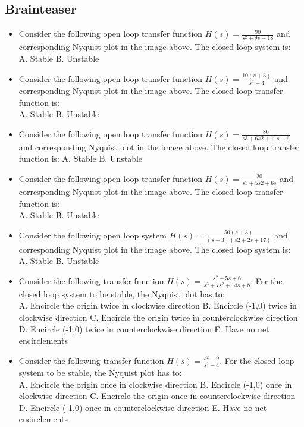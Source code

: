 \documentclass{document}
\begin{document}
	\subsection{Brainteaser}
	\begin{itemize}
		\item Consider the following open loop transfer function $H(s)=\frac{90}{s^2+9s+18}$ and corresponding Nyquist plot in the image above.
		The closed loop system is:\\
		A. Stable
		B. Unstable
		\item Consider the following open loop transfer function $H(s)=\frac{10(s+3)}{s^2−4}$ and corresponding Nyquist plot in the image above.
		The closed loop transfer function is:\\
		A. Stable
		B. Unstable
		\item Consider the following open loop transfer function $H(s)=\frac{80}{s3+6s2+11s+6}$ and corresponding Nyquist plot in the image above.
		The closed loop transfer function is:
		A. Stable
		B. Unstable
		\item Consider the following open loop transfer function $H(s)=\frac{20}{s3+5s2+6s}$ and corresponding Nyquist plot in the image above.
		The closed loop transfer function is:\\
		A. Stable
		B. Unstable
		\item Consider the following open loop system $H(s)= \frac{50(s+3)}{(s−3)(s2+2s+17)}$ and corresponding Nyquist plot in the image above.
		The closed loop system is:\\
		A. Stable
		B. Unstable
		\item Consider the following transfer function $H(s)=\frac{s^2−5s+6}{s^3+7s^2+14s+8}$. For the closed loop system to be stable, the Nyquist plot has to:\\
A. 		Encircle the origin twice in clockwise direction
		B. Encircle (-1,0) twice in clockwise direction
		C. Encircle the origin twice in counterclockwise direction
		D. Encircle (-1,0) twice in counterclockwise direction
		E. Have no net encirclements
		\item Consider the following transfer function $H(s)=\frac{s^2−9}{s^2−4}$. For the closed loop system to be stable, the Nyquist plot has to:\\
		A. Encircle the origin once in clockwise direction
		B. Encircle (-1,0) once in clockwise direction
		C. Encircle the origin once in counterclockwise direction
		D. Encircle (-1,0)  once in counterclockwise direction
		E. Have no net encirclements
	\end{itemize}
	
\end{document}
